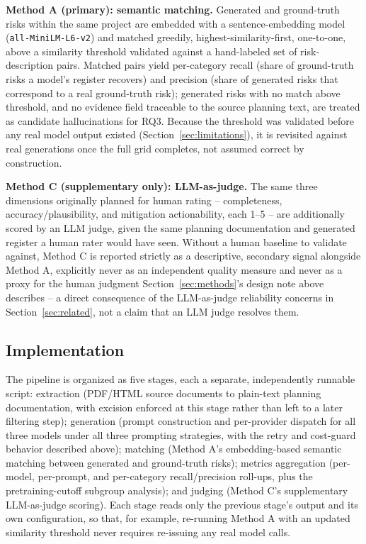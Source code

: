 \documentclass[conference]{IEEEtran}
\begin{document}
\textbf{Method A (primary): semantic matching.} Generated and ground-truth
risks within the same project are embedded with a sentence-embedding model
(\texttt{all-MiniLM-L6-v2}) and matched greedily, highest-similarity-first,
one-to-one, above a similarity threshold validated against a hand-labeled
set of risk-description pairs. Matched pairs yield per-category recall
(share of ground-truth risks a model's register recovers) and precision
(share of generated risks that correspond to a real ground-truth risk);
generated risks with no match above threshold, and no evidence field
traceable to the source planning text, are treated as candidate
hallucinations for RQ3. Because the threshold was validated before any real
model output existed (Section~\ref{sec:limitations}), it is revisited
against real generations once the full grid completes, not assumed correct
by construction.

\textbf{Method C (supplementary only): LLM-as-judge.} The same three
dimensions originally planned for human rating -- completeness,
accuracy/plausibility, and mitigation actionability, each 1--5 -- are
additionally scored by an LLM judge, given the same planning documentation
and generated register a human rater would have seen. Without a human
baseline to validate against, Method C is reported strictly as a
descriptive, secondary signal alongside Method A, explicitly never as an
independent quality measure and never as a proxy for the human judgment
Section~\ref{sec:methods}'s design note above describes -- a direct
consequence of the LLM-as-judge reliability concerns in
Section~\ref{sec:related}, not a claim that an LLM judge resolves them.

\subsection{Implementation}
The pipeline is organized as five stages, each a separate, independently
runnable script: extraction (PDF/HTML source documents to plain-text
planning documentation, with excision enforced at this stage rather than
left to a later filtering step); generation (prompt construction and
per-provider dispatch for all three models under all three prompting
strategies, with the retry and cost-guard behavior described above);
matching (Method A's embedding-based semantic matching between generated
and ground-truth risks); metrics aggregation (per-model, per-prompt, and
per-category recall/precision roll-ups, plus the pretraining-cutoff
subgroup analysis); and judging (Method C's supplementary LLM-as-judge
scoring). Each stage reads only the previous stage's output and its own
configuration, so that, for example, re-running Method A with an updated
similarity threshold never requires re-issuing any real model calls.
\end{document}
